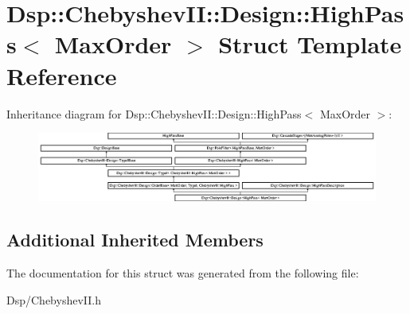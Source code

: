 \hypertarget{structDsp_1_1ChebyshevII_1_1Design_1_1HighPass}{\section{Dsp\-:\-:Chebyshev\-I\-I\-:\-:Design\-:\-:High\-Pass$<$ Max\-Order $>$ Struct Template Reference}
\label{structDsp_1_1ChebyshevII_1_1Design_1_1HighPass}
}
Inheritance diagram for Dsp\-:\-:Chebyshev\-I\-I\-:\-:Design\-:\-:High\-Pass$<$ Max\-Order $>$\-:\begin{figure}[H]
\begin{center}
\leavevmode
\includegraphics[height=2.281059cm]{structDsp_1_1ChebyshevII_1_1Design_1_1HighPass}
\end{center}
\end{figure}
\subsection*{Additional Inherited Members}


The documentation for this struct was generated from the following file\-:\begin{DoxyCompactItemize}
\item 
Dsp/Chebyshev\-I\-I.\-h\end{DoxyCompactItemize}
